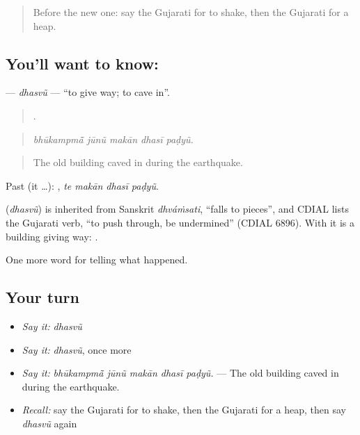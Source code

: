 \label{lesson:GU-C305-dhasvu}



\begin{quote}
Before the new one: say the Gujarati for to shake, then the Gujarati for a heap.
\end{quote}

\subsection*{You'll want to know: }
\textbf{} — \emph{dhasvũ} — \textquotedblleft{}to give way; to cave in\textquotedblright{}.

\begin{quote}
    .
\end{quote}

\begin{quote}
\emph{bhūkampmā̃ jūnũ makān dhasī paḍyũ.}
\end{quote}

\begin{quote}
The old building caved in during the earthquake.
\end{quote}

Past (it …):    , \emph{te makān dhasī paḍyũ}.

\begin{cousinweb}
\textbf{} (\emph{dhasvũ}) is inherited from Sanskrit \emph{dhváṁsati}, \textquotedblleft{}falls to pieces\textquotedblright{}, and CDIAL lists the Gujarati verb, \textquotedblleft{}to push through, be undermined\textquotedblright{} (CDIAL 6896). With \textbf{} it is a building giving way: \textbf{ }.
\end{cousinweb}

\begin{grammarlens}[title={What you've built}]
One more word for telling what happened.
\end{grammarlens}

\subsection*{Your turn}
\begin{itemize}
\raggedright
  \item \emph{Say it:} \emph{dhasvũ}
  \item \emph{Say it:} \emph{dhasvũ}, once more
  \item \emph{Say it:} \emph{bhūkampmā̃ jūnũ makān dhasī paḍyũ.} — The old building caved in during the earthquake.
  \item \emph{Recall:} say the Gujarati for to shake, then the Gujarati for a heap, then say \emph{dhasvũ} again
\end{itemize}

